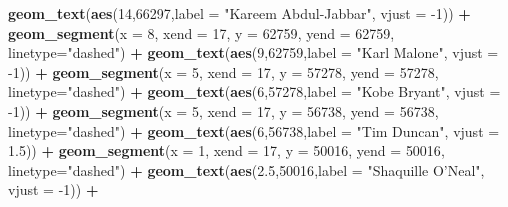 \documentclass[]{book}
\newenvironment{Shaded}{\begin{snugshade}}{\end{snugshade}}
\newcommand{\DataTypeTok}[1]{\textcolor[rgb]{0.13,0.29,0.53}{#1}}
\newcommand{\DecValTok}[1]{\textcolor[rgb]{0.00,0.00,0.81}{#1}}
\newcommand{\FloatTok}[1]{\textcolor[rgb]{0.00,0.00,0.81}{#1}}
\newcommand{\KeywordTok}[1]{\textcolor[rgb]{0.13,0.29,0.53}{\textbf{#1}}}
\newcommand{\NormalTok}[1]{#1}
\newcommand{\OperatorTok}[1]{\textcolor[rgb]{0.81,0.36,0.00}{\textbf{#1}}}
\newcommand{\StringTok}[1]{\textcolor[rgb]{0.31,0.60,0.02}{#1}}
\begin{document}
\begin{Shaded}
\begin{Highlighting}[]
\StringTok{  }\KeywordTok{geom_text}\NormalTok{(}\KeywordTok{aes}\NormalTok{(}\DecValTok{14}\NormalTok{,}\DecValTok{66297}\NormalTok{,}\DataTypeTok{label =} \StringTok{"Kareem Abdul-Jabbar"}\NormalTok{, }\DataTypeTok{vjust =} \DecValTok{-1}\NormalTok{)) }\OperatorTok{+}\StringTok{ }
\StringTok{  }\KeywordTok{geom_segment}\NormalTok{(}\DataTypeTok{x =} \DecValTok{8}\NormalTok{, }\DataTypeTok{xend =} \DecValTok{17}\NormalTok{, }\DataTypeTok{y =} \DecValTok{62759}\NormalTok{, }\DataTypeTok{yend =} \DecValTok{62759}\NormalTok{, }\DataTypeTok{linetype=}\StringTok{"dashed"}\NormalTok{) }\OperatorTok{+}\StringTok{ }
\StringTok{  }\KeywordTok{geom_text}\NormalTok{(}\KeywordTok{aes}\NormalTok{(}\DecValTok{9}\NormalTok{,}\DecValTok{62759}\NormalTok{,}\DataTypeTok{label =} \StringTok{"Karl Malone"}\NormalTok{, }\DataTypeTok{vjust =} \DecValTok{-1}\NormalTok{)) }\OperatorTok{+}
\StringTok{  }\KeywordTok{geom_segment}\NormalTok{(}\DataTypeTok{x =} \DecValTok{5}\NormalTok{, }\DataTypeTok{xend =} \DecValTok{17}\NormalTok{, }\DataTypeTok{y =} \DecValTok{57278}\NormalTok{, }\DataTypeTok{yend =} \DecValTok{57278}\NormalTok{, }\DataTypeTok{linetype=}\StringTok{"dashed"}\NormalTok{) }\OperatorTok{+}\StringTok{ }
\StringTok{  }\KeywordTok{geom_text}\NormalTok{(}\KeywordTok{aes}\NormalTok{(}\DecValTok{6}\NormalTok{,}\DecValTok{57278}\NormalTok{,}\DataTypeTok{label =} \StringTok{"Kobe Bryant"}\NormalTok{, }\DataTypeTok{vjust =} \DecValTok{-1}\NormalTok{)) }\OperatorTok{+}
\StringTok{  }\KeywordTok{geom_segment}\NormalTok{(}\DataTypeTok{x =} \DecValTok{5}\NormalTok{, }\DataTypeTok{xend =} \DecValTok{17}\NormalTok{, }\DataTypeTok{y =} \DecValTok{56738}\NormalTok{, }\DataTypeTok{yend =} \DecValTok{56738}\NormalTok{, }\DataTypeTok{linetype=}\StringTok{"dashed"}\NormalTok{) }\OperatorTok{+}\StringTok{ }
\StringTok{  }\KeywordTok{geom_text}\NormalTok{(}\KeywordTok{aes}\NormalTok{(}\DecValTok{6}\NormalTok{,}\DecValTok{56738}\NormalTok{,}\DataTypeTok{label =} \StringTok{"Tim Duncan"}\NormalTok{, }\DataTypeTok{vjust =} \FloatTok{1.5}\NormalTok{)) }\OperatorTok{+}
\StringTok{  }\KeywordTok{geom_segment}\NormalTok{(}\DataTypeTok{x =} \DecValTok{1}\NormalTok{, }\DataTypeTok{xend =} \DecValTok{17}\NormalTok{, }\DataTypeTok{y =} \DecValTok{50016}\NormalTok{, }\DataTypeTok{yend =} \DecValTok{50016}\NormalTok{, }\DataTypeTok{linetype=}\StringTok{"dashed"}\NormalTok{) }\OperatorTok{+}\StringTok{ }
\StringTok{  }\KeywordTok{geom_text}\NormalTok{(}\KeywordTok{aes}\NormalTok{(}\FloatTok{2.5}\NormalTok{,}\DecValTok{50016}\NormalTok{,}\DataTypeTok{label =} \StringTok{"Shaquille O'Neal"}\NormalTok{, }\DataTypeTok{vjust =} \DecValTok{-1}\NormalTok{)) }\OperatorTok{+}

\end{Highlighting}
\end{Shaded}
\end{document}
